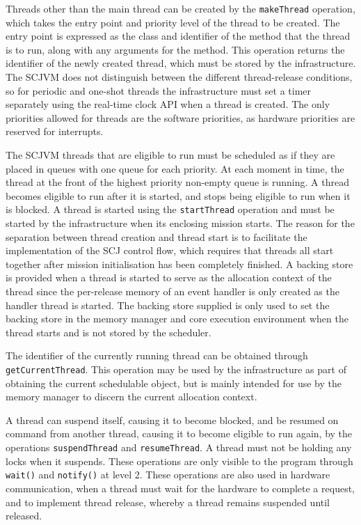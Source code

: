 Threads other than the main thread can be created by the
\texttt{makeThread} operation, which takes the entry point and
priority level of the thread to be created.
The entry point is expressed as the class and identifier of the method
that the thread is to run, along with any arguments for the method.
This operation returns the identifier of the newly created thread,
which must be stored by the infrastructure.
The SCJVM does not distinguish between the different thread-release
conditions, so for periodic and one-shot threads the infrastructure
must set a timer separately using the real-time clock API when a
thread is created.
The only priorities allowed for threads are the software priorities,
as hardware priorities are reserved for interrupts.

The SCJVM threads that are eligible to run must be scheduled as if
they are placed in queues with one queue for each priority.
At each moment in time, the thread at the front of the highest
priority non-empty queue is running.
A thread becomes eligible to run after it is started, and stops being
eligible to run when it is blocked.
A thread is started using the \texttt{start\-Thread} operation and
must be started by the infrastructure when its enclosing mission
starts.
The reason for the separation between thread creation and thread start
is to facilitate the implementation of the SCJ control flow, which
requires that threads all start together after mission initialisation
has been completely finished.
A backing store is provided when a thread is started to serve as the
allocation context of the thread since the per-release memory of an
event handler is only created as the handler thread is started.
The backing store supplied is only used to set the backing store in
the memory manager and core execution environment when the thread
starts and is not stored by the scheduler.

The identifier of the currently running thread can be obtained through
\texttt{get\-Current\-Thread}.
This operation may be used by the infrastructure as part of obtaining
the current schedulable object, but is mainly intended for use by the
memory manager to discern the current allocation context.

A thread can suspend itself, causing it to become blocked, and be
resumed on command from another thread, causing it to become eligible
to run again, by the operations \texttt{suspend\-Thread} and
\texttt{resume\-Thread}.
A thread must not be holding any locks when it suspends.
These operations are only visible to the program through
\texttt{wait()} and \texttt{notify()} at level 2.
These operations are also used in hardware communication, when a
thread must wait for the hardware to complete a request, and to
implement thread release, whereby a thread remains suspended until
released.


